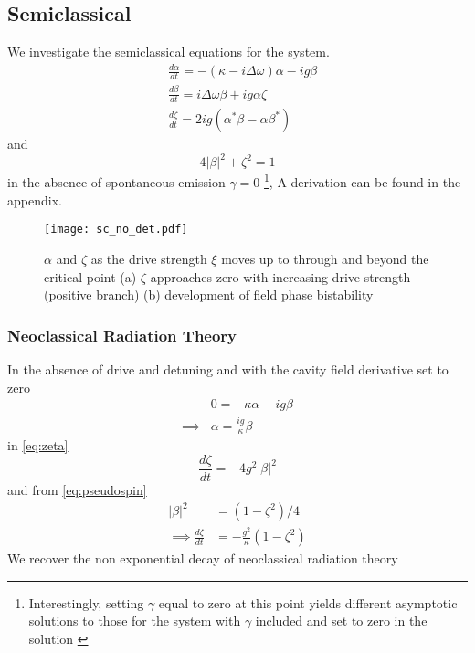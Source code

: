 \subsection{Semiclassical}
We investigate the semiclassical equations for the system.
\begin{align}
  &\frac{d \alpha}{dt} = -(\kappa -i \Delta \omega) \alpha-ig \beta \label{eq:alpha}\\
  &\frac{d \beta}{dt} = i \Delta \omega \beta +ig \alpha \zeta \label{eq:beta}\\
  &\frac{d \zeta}{dt} = 2 i g(\alpha^* \beta -\alpha \beta^*)\label{eq:zeta}
\end{align}
and
\begin{equation}
  4|\beta|^2+\zeta^2 = 1 \label{eq:pseudospin}
\end{equation}
in the absence of spontaneous emission $\gamma=0$
\footnote{ Interestingly, setting $\gamma$ equal to zero at this point yields different asymptotic solutions to those for the system with $\gamma$ included and set to zero in the solution \cite{Alsing1990}},
A derivation can be found in the appendix.
\begin{figure}[htb]
  \texttt{[image: sc\_no\_det.pdf]}
  \caption{$\alpha$ and $\zeta$ as the drive strength $\xi$ moves up to through and beyond the critical point (a) $\zeta$ approaches zero with increasing drive strength (positive branch)\label{fig:zeta} (b) development of field phase bistability}\label{fig:alpha}
  \label{fig:sc_no_det}
\end{figure}
\subsubsection{Neoclassical Radiation Theory}
In the absence of drive and detuning and with the cavity field derivative set to zero
\begin{align}
  & 0 = -\kappa \alpha - ig \beta \\
  \implies & \alpha = \frac{ig}{\kappa} \beta
\end{align}
in \cref{eq:zeta}
\begin{equation}
  \frac{d \zeta}{dt} = -4 g^2 |\beta|^2
\end{equation}
and from \cref{eq:pseudospin}
\begin{align}
   |\beta|^2 &= (1-\zeta^2)/4 \\
\implies \frac{d \zeta}{dt} &= -\frac{g^2}{\kappa} (1-\zeta^2)
\end{align}
We recover the non exponential decay of neoclassical radiation theory
